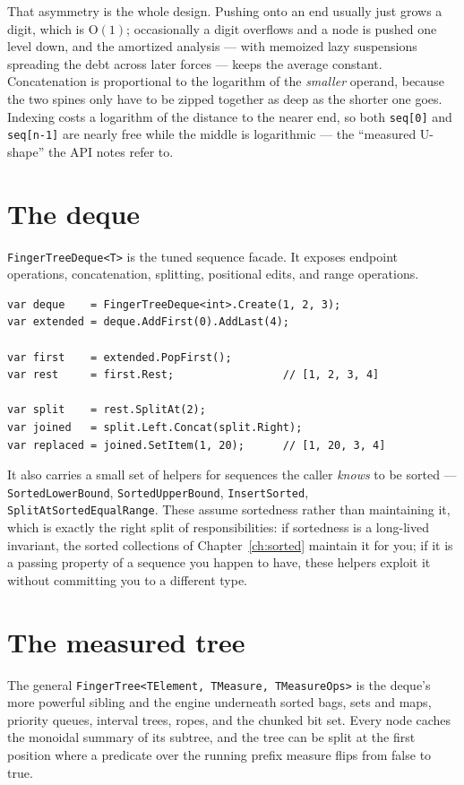 \documentclass[11pt,twoside,openright]{book}
\newcommand{\code}[1]{\texorpdfstring{\textcolor{d7ink}{\texttt{#1}}}{#1}}
\newcommand{\bigoh}[1]{$\mathrm{O}(#1)$}
\begin{document}
That asymmetry is the whole design. Pushing onto an end usually just grows a
digit, which is \bigoh{1}; occasionally a digit overflows and a node is pushed
one level down, and the amortized analysis --- with memoized lazy suspensions
spreading the debt across later forces --- keeps the average constant.
Concatenation is proportional to the logarithm of the \emph{smaller} operand,
because the two spines only have to be zipped together as deep as the shorter
one goes. Indexing costs a logarithm of the distance to the nearer end, so both
\code{seq[0]} and \code{seq[n-1]} are nearly free while the middle is
logarithmic --- the ``measured U-shape'' the API notes refer to.

\section{The deque}

\code{FingerTreeDeque<T>} is the tuned sequence facade. It exposes endpoint
operations, concatenation, splitting, positional edits, and range operations.

\begin{lstlisting}[language={[Sharp]C}]
var deque    = FingerTreeDeque<int>.Create(1, 2, 3);
var extended = deque.AddFirst(0).AddLast(4);

var first    = extended.PopFirst();
var rest     = first.Rest;                 // [1, 2, 3, 4]

var split    = rest.SplitAt(2);
var joined   = split.Left.Concat(split.Right);
var replaced = joined.SetItem(1, 20);      // [1, 20, 3, 4]
\end{lstlisting}

It also carries a small set of helpers for sequences the caller \emph{knows} to
be sorted --- \code{SortedLowerBound}, \code{SortedUpperBound},
\code{InsertSorted}, \code{SplitAtSortedEqualRange}. These assume sortedness
rather than maintaining it, which is exactly the right split of
responsibilities: if sortedness is a long-lived invariant, the sorted
collections of Chapter~\ref{ch:sorted} maintain it for you; if it is a passing
property of a sequence you happen to have, these helpers exploit it without
committing you to a different type.

\section{The measured tree}

The general \code{FingerTree<TElement, TMeasure, TMeasureOps>} is the deque's
more powerful sibling and the engine underneath sorted bags, sets and maps,
priority queues, interval trees, ropes, and the chunked bit set. Every node
caches the monoidal summary of its subtree, and the tree can be split at the
first position where a predicate over the running prefix measure flips from
false to true.
\end{document}
